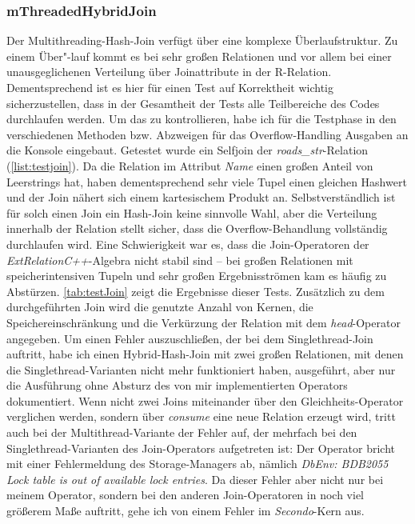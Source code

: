 \documentclass[a4paper,12pt,twoside]{article}
\newcommand{\Fb}[1]{\textit{#1}} %
\begin{document}
\subsubsection{mThreadedHybridJoin}

Der Multithreading-Hash-Join verfügt über eine komplexe Überlaufstruktur. Zu einem Über"-lauf kommt es bei sehr großen Relationen und vor allem bei einer unausgeglichenen Verteilung über Joinattribute in der R-Relation. Dementsprechend ist es hier für einen Test auf Korrektheit wichtig sicherzustellen, dass in der Gesamtheit der Tests alle Teilbereiche des Codes durchlaufen werden. Um das zu kontrollieren, habe ich für die Testphase in den verschiedenen Methoden bzw. Abzweigen für das Overflow-Handling Ausgaben an die Konsole eingebaut. Getestet wurde ein Selfjoin der \Fb{roads\_str}-Relation (\autoref{list:testjoin}). Da die Relation im Attribut \Fb{Name} einen großen Anteil von Leerstrings hat, haben dementsprechend sehr viele Tupel einen gleichen Hashwert und der Join nähert sich einem kartesischem Produkt an. Selbstverständlich ist für solch einen Join ein Hash-Join keine sinnvolle Wahl, aber die Verteilung innerhalb der Relation stellt sicher, dass die Overflow-Behandlung vollständig durchlaufen wird. Eine Schwierigkeit war es, dass die Join-Operatoren der \Fb{ExtRelationC++}-Algebra nicht stabil sind -- bei großen Relationen mit speicherintensiven Tupeln und sehr großen Ergebnisströmen kam es häufig zu Abstürzen. \autoref{tab:testJoin} zeigt die Ergebnisse dieser Tests. Zusätzlich zu dem durchgeführten Join wird die genutzte Anzahl von Kernen, die Speichereinschränkung und die Verkürzung der Relation mit dem \Fb{head}-Operator angegeben. Um einen Fehler auszuschließen, der bei dem Singlethread-Join auftritt, habe ich einen Hybrid-Hash-Join mit zwei großen Relationen, mit denen die Singlethread-Varianten nicht mehr funktioniert haben, ausgeführt, aber nur die Ausführung ohne Absturz des von mir implementierten Operators dokumentiert. Wenn nicht zwei Joins miteinander über den Gleichheits-Operator verglichen werden, sondern über \Fb{consume} eine neue Relation erzeugt wird, tritt auch bei der Multithread-Variante der Fehler auf, der mehrfach bei den Singlethread-Varianten des Join-Operators aufgetreten ist: Der Operator bricht mit einer Fehlermeldung des Storage-Managers ab, nämlich \Fb{DbEnv: BDB2055 Lock table is out of available lock entries}. Da dieser Fehler aber nicht nur bei meinem Operator, sondern bei den anderen Join-Operatoren in noch viel größerem Maße auftritt, gehe ich von einem Fehler im \Fb{Secondo}-Kern aus.
\end{document}
